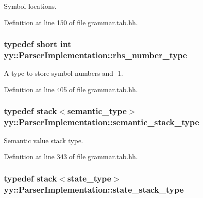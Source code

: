 Symbol locations. 



Definition at line 150 of file grammar.tab.hh.

\hypertarget{classyy_1_1_parser_implementation_a8560d05133a5d38235df7281ddf0a494}{
\subsubsection[{rhs\_\-number\_\-type}]{\setlength{\rightskip}{0pt plus 5cm}typedef short int {\bf yy::ParserImplementation::rhs\_\-number\_\-type}}}
\label{classyy_1_1_parser_implementation_a8560d05133a5d38235df7281ddf0a494}


A type to store symbol numbers and -\/1. 



Definition at line 405 of file grammar.tab.hh.

\hypertarget{classyy_1_1_parser_implementation_ae4682cabaf647f24fab3e2a350732849}{
\subsubsection[{semantic\_\-stack\_\-type}]{\setlength{\rightskip}{0pt plus 5cm}typedef {\bf stack}$<${\bf semantic\_\-type}$>$ {\bf yy::ParserImplementation::semantic\_\-stack\_\-type}}}
\label{classyy_1_1_parser_implementation_ae4682cabaf647f24fab3e2a350732849}


Semantic value stack type. 



Definition at line 343 of file grammar.tab.hh.

\hypertarget{classyy_1_1_parser_implementation_a73ef7b307555b32460fa788f1c4d334a}{
\subsubsection[{state\_\-stack\_\-type}]{\setlength{\rightskip}{0pt plus 5cm}typedef {\bf stack}$<${\bf state\_\-type}$>$ {\bf yy::ParserImplementation::state\_\-stack\_\-type}}}
\label{classyy_1_1_parser_implementation_a73ef7b307555b32460fa788f1c4d334a}



